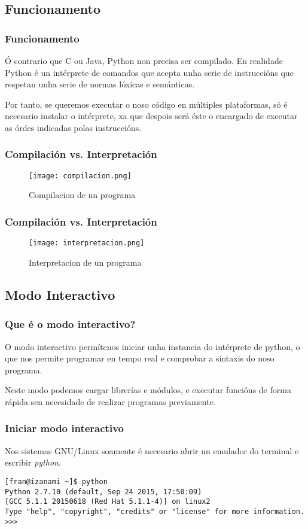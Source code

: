 \subsection{Funcionamento}
\label{subsec:funcionamento}

\begin{frame}
  \frametitle{Funcionamento}
  Ó contrario que C ou Java, Python non precisa ser compilado. En realidade
  Python é un intérprete de comandos que acepta unha serie de instruccións que
  respetan unha serie de normas lóxicas e semánticas.

  Por tanto, se queremos executar o noso código en múltiples plataformas, só é
  necesario instalar o intérprete, xa que despois será éste o encargado de
  executar as órdes indicadas polas instruccións.
\end{frame}

\begin{frame}
  \frametitle{Compilación vs. Interpretación}
  \begin{figure}[ht]
    \centering
    \texttt{[image: compilacion.png]}
    \caption{Compilacion de un programa}
  \end{figure}
\end{frame}

\begin{frame}
  \frametitle{Compilación vs. Interpretación}
  \begin{figure}[ht]
    \centering
    \texttt{[image: interpretacion.png]}
    \caption{Interpretacion de un programa}
  \end{figure}
\end{frame}

\subsection{Modo Interactivo}
\label{subsec:modo interactivo}

\begin{frame}
  \frametitle{Que é o modo interactivo?}
  O modo interactivo permítenos iniciar unha instancia do intérprete de python,
  o que nos permite programar en tempo real e comprobar a sintaxis do noso
  programa.
  
  Neste modo podemos cargar librerías e módulos, e executar funcións de forma
  rápida sen necesidade de realizar programas previamente.
\end{frame}

\begin{frame}[fragile]
  \frametitle{Iniciar modo interactivo}
  Nos sistemas GNU/Linux soamente é necesario abrir un emulador do terminal e
  escribir \emph{python}.
  \small
\begin{verbatim}
[fran@izanami ~]$ python
Python 2.7.10 (default, Sep 24 2015, 17:50:09) 
[GCC 5.1.1 20150618 (Red Hat 5.1.1-4)] on linux2
Type "help", "copyright", "credits" or "license" for more information.
>>> 
\end{verbatim}
  \normalsize
\end{frame}


